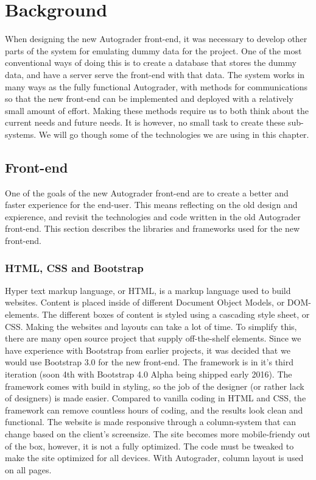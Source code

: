 \chapter{Background}
When designing the new Autograder front-end, it was necessary to develop other parts of the system for emulating dummy data for the project. One of the most conventional ways of doing this is to create a database that stores the dummy data, and have a server serve the front-end with that data. The system works in many ways as the fully functional Autograder, with methods for communications so that the new front-end can be implemented and deployed with a relatively small amount of effort. Making these methods require us to both think about the current needs and future needs. It is however, no small task to create these sub-systems. We will go though some of the technologies we are using in this chapter.

\section{Front-end}
One of the goals of the new Autograder front-end are to create a better and faster experience for the end-user. This means reflecting on the old design and expierence, and revisit the technologies and code written in the old Autograder front-end. This section describes the libraries and frameworks used for the new front-end.

\subsection{HTML, CSS and Bootstrap}
Hyper text markup language, or HTML, is a markup language used to build websites. Content is placed inside of different Document Object Models, or DOM-elements. The different boxes of content is styled using a cascading style sheet, or CSS. Making the websites and layouts can take a lot of time. To simplify this, there are many open source project that supply off-the-shelf elements. Since we have experience with Bootstrap from earlier projects, it was decided that we would use Bootstrap 3.0 \cite{bootstrap} for the new front-end. The framework is in it's third iteration (soon 4th with Bootstrap 4.0 Alpha being shipped early 2016). The framework comes with build in styling, so the job of the designer (or rather lack of designers) is made easier. Compared to vanilla coding in HTML and CSS, the framework can remove countless hours of coding, and the results look clean and functional. The website is made responsive through a column-system that can change based on the client's screensize. The site becomes more mobile-friendy out of the box, however, it is not a fully optimized. The code must be tweaked to make the site optimized for all devices. With Autograder, column layout is used on all pages.

